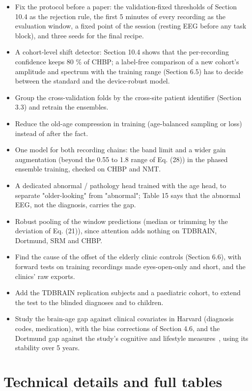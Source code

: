 \documentclass[11pt,a4paper]{article}
\begin{document}
\begin{itemize}
\item Fix the protocol before a paper: the validation-fixed thresholds of Section 10.4 as the rejection rule, the first 5 minutes of every recording as the evaluation window, a fixed point of the session (resting EEG before any task block), and three seeds for the final recipe.
\item A cohort-level shift detector: Section 10.4 shows that the per-recording confidence keeps 80 \% of CHBP; a label-free comparison of a new cohort's amplitude and spectrum with the training range (Section 6.5) has to decide between the standard and the device-robust model.
\item Group the cross-validation folds by the cross-site patient identifier (Section 3.3) and retrain the ensembles.
\item Reduce the old-age compression in training (age-balanced sampling or loss) instead of after the fact.
\item One model for both recording chains: the band limit and a wider gain augmentation (beyond the 0.55 to 1.8 range of Eq. (28)) in the phased ensemble training, checked on CHBP and NMT.
\item A dedicated abnormal / pathology head trained with the age head, to separate "older-looking" from "abnormal"; Table 15 says that the abnormal EEG, not the diagnosis, carries the gap.
\item Robust pooling of the window predictions (median or trimming by the deviation of Eq. (21)), since attention adds nothing on TDBRAIN, Dortmund, SRM and CHBP.
\item Find the cause of the offset of the elderly clinic controls (Section 6.6), with forward tests on training recordings made eyes-open-only and short, and the clinics' raw exports.
\item Add the TDBRAIN replication subjects and a paediatric cohort, to extend the test to the blinded diagnoses and to children.
\item Study the brain-age gap against clinical covariates in Harvard (diagnosis codes, medication), with the bias corrections of Section 4.6, and the Dortmund gap against the study's cognitive and lifestyle measures~\citep{gajewski2022dortmund}, using its stability over 5 years.
\end{itemize}

\section{Technical details and full tables}
\end{document}
